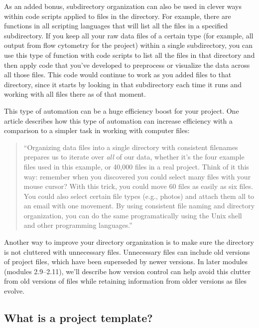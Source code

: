 \documentclass[]{tufte-book}
\begin{document}
As an added bonus, subdirectory organization can also be used in clever ways
within code scripts applied to files in the directory. For example, there are
functions in all scripting languages that will list all the files in a specified
subdirectory. If you keep all your raw data files of a certain type (for
example, all output from flow cytometry for the project) within a single
subdirectory, you can use this type of function with code scripts to list all
the files in that directory and then apply code that you've developed to
preprocess or visualize the data across all those files. This code would
continue to work as you added files to that directory, since it starts by
looking in that subdirectory each time it runs and working with all files there
as of that moment.

This type of automation can be a huge efficiency boost for your project.
One article describes how this type of automation can increase efficiency
with a comparison to a simpler task in working with computer files:

\begin{quote}
``Organizing data files into a single directory with consistent filenames
prepares us to iterate over \emph{all} of our data, whether it's the four example
files used in this example, or 40,000 files in a real project. Think of it this
way: remember when you discovered you could select many files with your mouse
cursor? With this trick, you could move 60 files as easily as six files. You
could also select certain file types (e.g., photos) and attach them all to an
email with one movement. By using consistent file naming and directory
organization, you can do the same programatically using the Unix shell and other
programming languages.'' \citep{buffalo2015bioinformatics}
\end{quote}

Another way to improve your directory organization is to make sure the directory
is not cluttered with unnecessary files. Unnecessary files can include old versions
of project files, which have been superseded by newer versions. In later modules
(modules 2.9--2.11), we'll describe how version control can help avoid this clutter
from old versions of files while retaining information from older versions as
files evolve.

\subsection{What is a project template?}\label{what-is-a-project-template}
\end{document}
